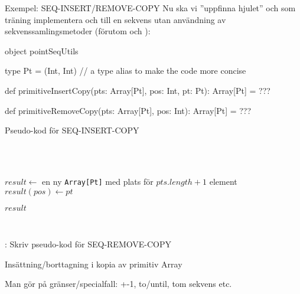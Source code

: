 \begin{Slide}{Exempel: SEQ-INSERT/REMOVE-COPY}
Nu ska vi ''uppfinna hjulet'' och som träning implementera  och  till en  sekvens utan användning av sekvenssamlingsmetoder (förutom  och ):
\begin{Code}
object pointSeqUtils {
  type Pt = (Int, Int)  // a type alias to make the code more concise

  def primitiveInsertCopy(pts: Array[Pt], pos: Int, pt: Pt): Array[Pt] = ???

  def primitiveRemoveCopy(pts: Array[Pt], pos: Int): Array[Pt] = ???
}
\end{Code}
\end{Slide}




\begin{Slide}{Pseudo-kod för SEQ-INSERT-COPY}\SlideFontSmall
\begin{algorithm}[H]

  ~\\
 
 ~\\
 
 
 \noindent\hrulefill
 
  $result \leftarrow$ en ny \texttt{Array[Pt]} med plats för $pts.length + 1$ element \\
 $result(pos) \leftarrow pt$ \\

 \Return $result$

  \noindent\hrulefill\\
\end{algorithm}
\pause\vspace{0.5em}: Skriv pseudo-kod för SEQ-REMOVE-COPY
\end{Slide}

\begin{Slide}{Insättning/borttagning i kopia av primitiv Array}
\vspace{-0.6em}

\pause
\SlideFontSmall Man gör  på gränser/specialfall: +-1, to/until, tom sekvens etc.
\end{Slide}

